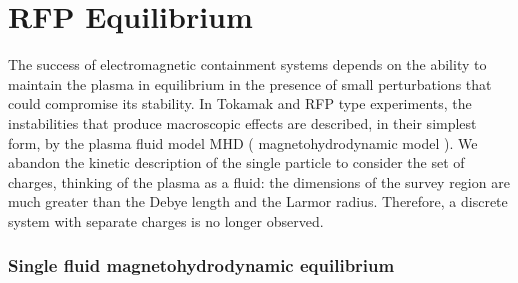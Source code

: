 \chapter{RFP Equilibrium}

The success of electromagnetic containment systems depends on the ability to maintain the plasma in equilibrium in the presence of small perturbations
that could compromise its stability. In Tokamak and RFP type experiments, the instabilities that produce macroscopic effects are described, in their simplest form, by the plasma fluid model MHD ( magnetohydrodynamic model ). 
We abandon the kinetic description of the single particle to consider the set of charges, thinking of the plasma as a fluid: the dimensions of the survey region are much greater than the Debye length and the Larmor radius. Therefore, a discrete system with separate charges is no longer observed.

\subsection{Single fluid magnetohydrodynamic equilibrium}

